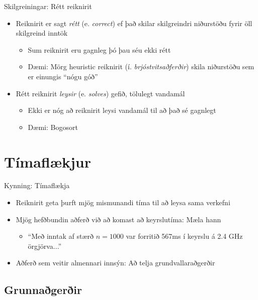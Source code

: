 \documentclass{beamer}
\begin{document}
\begin{frame}{Skilgreiningar: Rétt reiknirit}
\begin{itemize}
 \item Reiknirit er sagt \emph{rétt} (e. \emph{correct}) ef það skilar skilgreindri niðurstöðu fyrir öll skilgreind inntök
 \begin{itemize} \pause
  \item Sum reiknirit eru gagnleg þó þau séu ekki rétt
  \item Dæmi: Mörg heuristic reiknirit (í. \emph{brjóstvitsaðferðir}) skila niðurstöðu sem er einungis ``nógu góð''
 \end{itemize}
 \item Rétt reiknirit \emph{leysir} (e. \emph{solves}) gefið, tölulegt vandamál
 \begin{itemize} \pause
  \item Ekki er nóg að reiknirit leysi vandamál til að það sé gagnlegt
  \item Dæmi: Bogosort
 \end{itemize}
\end{itemize}
\end{frame}

\section{Tímaflækjur}

\begin{frame}{Kynning: Tímaflækja}
\begin{itemize}
 \item Reiknirit geta þurft mjög mismunandi tíma til að leysa sama verkefni
 \item Mjög hefðbundin aðferð við að komast að keyrslutíma: Mæla hann
 \begin{itemize}
  \item ``Með inntak af stærð $n = 1000$ var forritið 567ms í keyrslu á 2.4 GHz örgjörva...''
 \end{itemize}
 \item Aðferð sem veitir almennari innsýn: Að telja grundvallaraðgerðir
\end{itemize}
\end{frame}

\subsection{Grunnaðgerðir}
\end{document}
